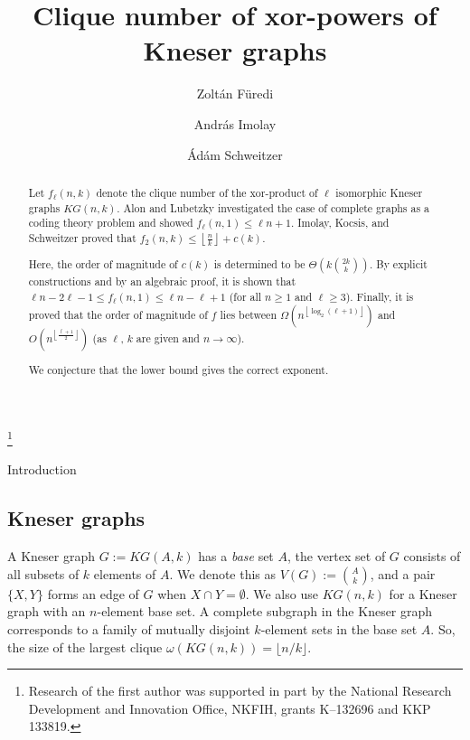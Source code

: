 \documentclass[12pt,a4paper]{amsart}
\makeatletter
\numberwithin{equation}{section}
\theoremstyle{plain}
\theoremstyle{definition}
\newcommand{\trivup}{\left\lfloor\frac{n}{k}\right\rfloor}
\newcommand{\andris}[1]{{\color{magenta}[{ \textbf{Andris:}  #1}]\marginpar{\color{magenta}*}}}
\newcommand{\NN}{n}
\newcommand{\mainsectionstyle}{%
  \renewcommand{\@secnumfont}{\bfseries}
  \renewcommand\section{\@startsection{section}{1}%
	\z@{.7\linespacing\@plus\linespacing}{.5\linespacing}%
	{\normalfont\large\scshape\centering\bfseries}}
}
\makeatother
\begin{document}
\mainsectionstyle
\title{Clique number of xor-powers of Kneser graphs}
\author{
Zoltán Füredi
\and
András Imolay
\and
Ádám Schweitzer}
\thanks{
Research
of the first author was supported in part by the National Research Development and Innovation Office, NKFIH,
grants K--132696 and KKP 133819.}






\begin{abstract}
Let $f_\ell(\NN, k)$ denote the clique number of the xor-product of $\ell$ isomorphic Kneser graphs $KG(\NN,k)$.
Alon and Lubetzky investigated the case of complete graphs as a coding theory problem and showed $f_\ell(\NN,1)\leq \ell \NN +1$.
Imolay, Kocsis, and Schweitzer proved that $f_2(\NN,k)\leq \trivup+c(k)$.

Here, the order of magnitude of $c(k)$ is determined to be $\Theta\left( k \binom{2k}{k}\right)$.
By explicit constructions and by an algebraic proof, it is shown that  $\ell\NN- 2\ell-1 \leq f_\ell(\NN,1)\leq \ell\NN-\ell+1$ (for all $\NN\geq 1$ and $\ell\geq 3$).
Finally, %
 it is proved that the order of magnitude of $f$ lies between $\Omega\left(\NN^{\left\lfloor \log_2(\ell+1)\right\rfloor}\right)$ and $O\left(\NN^{\left\lfloor \frac{\ell+1}{2}  \right\rfloor} \right)$  (as $\ell$, $k$ are given and  $\NN\to \infty$).

We conjecture that the lower bound gives the correct exponent.
\end{abstract}


\maketitle




\section{Introduction}

\subsection{Kneser graphs}
A Kneser graph $G:= KG(A,k)$ has a {\em base} set $A$, the vertex set of $G$ consists of all subsets of $k$ elements of $A$. We denote this as $V(G):= \binom{A}{k}$, and a pair $\{X,Y\}$ forms an edge of $G$ when $X\cap Y=\emptyset$. We also use $KG(n,k)$ for a Kneser graph with an $n$-element base set.
A complete subgraph in the Kneser graph corresponds to a family of mutually disjoint $k$-element sets in the base set $A$. So, the size of the largest clique
 $\omega(KG(\NN,k))=\lfloor \NN/k\rfloor$.
\end{document}
